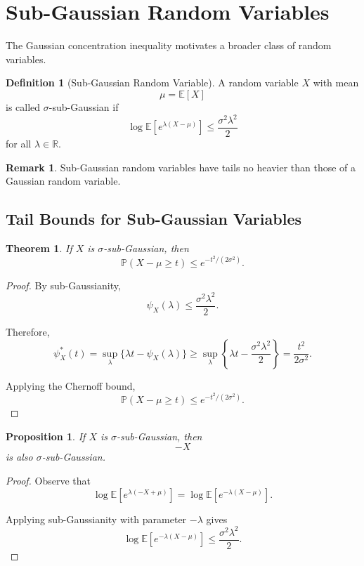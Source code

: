 \documentclass[12pt,oneside]{book}
\numberwithin{equation}{section}
\theoremstyle{definition}
\newtheorem{definition}{Definition}[section]
\newtheorem{remark}{Remark}[section]
\theoremstyle{plain}
\newtheorem{theorem}{Theorem}[section]
\newtheorem{proposition}{Proposition}[section]
\theoremstyle{remark}
\newcommand{\R}{\mathbb{R}}
\newcommand{\E}{\mathbb{E}}
\newcommand{\Prob}{\mathbb{P}}
\begin{document}
\section{Sub-Gaussian Random Variables}

The Gaussian concentration inequality motivates a broader class of random variables.

\begin{definition}[Sub-Gaussian Random Variable]
A random variable $X$ with mean
\[
\mu=\E[X]
\]
is called $\sigma$-sub-Gaussian if
\[
\log\E[e^{\lambda(X-\mu)}]
\leq
\frac{\sigma^2\lambda^2}{2}
\]
for all $\lambda\in\R$.
\end{definition}

\begin{remark}
Sub-Gaussian random variables have tails no heavier than those of a Gaussian random variable.
\end{remark}

\subsection{Tail Bounds for Sub-Gaussian Variables}

\begin{theorem}
If $X$ is $\sigma$-sub-Gaussian, then
\[
\Prob(X-\mu\geq t)
\leq
e^{-t^2/(2\sigma^2)}.
\]
\end{theorem}

\begin{proof}
By sub-Gaussianity,
\[
\psi_X(\lambda)
\leq
\frac{\sigma^2\lambda^2}{2}.
\]

Therefore,
\[
\psi_X^*(t)
=
\sup_\lambda
\{
\lambda t-\psi_X(\lambda)
\}
\geq
\sup_\lambda
\left\{
\lambda t-\frac{\sigma^2\lambda^2}{2}
\right\}
=
\frac{t^2}{2\sigma^2}.
\]

Applying the Chernoff bound,
\[
\Prob(X-\mu\geq t)
\leq
e^{-t^2/(2\sigma^2)}.
\]
\end{proof}

\begin{proposition}
If $X$ is $\sigma$-sub-Gaussian, then
\[
-X
\]
is also $\sigma$-sub-Gaussian.
\end{proposition}

\begin{proof}
Observe that
\[
\log\E[e^{\lambda(-X+\mu)}]
=
\log\E[e^{-\lambda(X-\mu)}].
\]

Applying sub-Gaussianity with parameter $-\lambda$ gives
\[
\log\E[e^{-\lambda(X-\mu)}]
\leq
\frac{\sigma^2\lambda^2}{2}.
\]
\end{proof}
\end{document}

